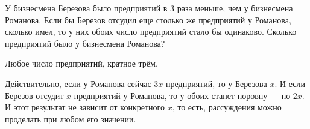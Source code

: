 
\begin{itemize}
\itA У бизнесмена Березова было предприятий в 3 раза меньше, чем у бизнесмена Романова. Если бы Березов отсудил еще столько же предприятий у Романова, сколько имел, то у них обоих число предприятий стало бы одинаково. Сколько предприятий было у бизнесмена Романова?

\itr Любое число предприятий, кратное трём.

Действительно, если у Романова сейчас $3x$ предприятий, то у Березова $x$. И если Березов отсудит $x$ предприятий у Романова, то у обоих станет поровну — по $2x$. И этот результат не зависит от конкретного $x$, то есть, рассуждения можно проделать при любом его значении.
\end{itemize}
